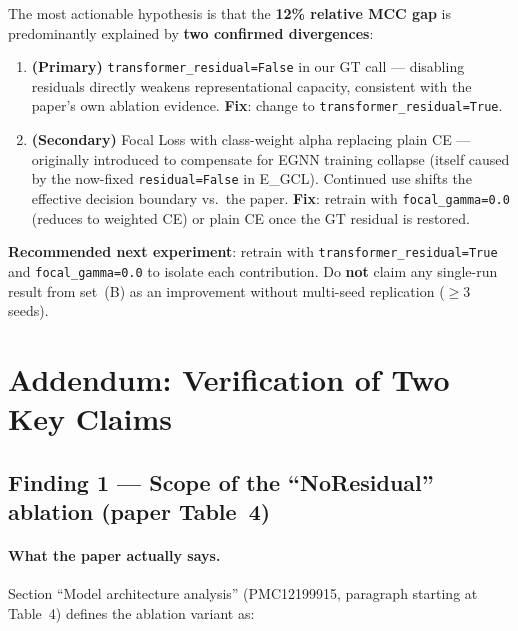 \documentclass[10pt, a4paper]{article}
\newcommand{\code}[1]{\texttt{\small #1}}
\begin{document}
\begin{tcolorbox}[colback=lightbg, colframe=primaryblue,
    title=\textbf{Root Cause Hypothesis and Recommended Action}]
The most actionable hypothesis is that the \textbf{12\% relative MCC gap} is
predominantly explained by \textbf{two confirmed divergences}:

\begin{enumerate}[leftmargin=1.5em, itemsep=2pt]
    \item \textbf{(Primary)} \code{transformer\_residual=False} in our GT call ---
    disabling residuals directly weakens representational capacity, consistent with
    the paper's own ablation evidence. \textbf{Fix}: change to \code{transformer\_residual=True}.

    \item \textbf{(Secondary)} Focal Loss with class-weight alpha replacing plain CE ---
    originally introduced to compensate for EGNN training collapse (itself caused by
    the now-fixed \code{residual=False} in E\_GCL).
    Continued use shifts the effective decision boundary vs.\ the paper.
    \textbf{Fix}: retrain with \code{focal\_gamma=0.0} (reduces to weighted CE) or plain CE
    once the GT residual is restored.
\end{enumerate}

\textbf{Recommended next experiment}: retrain with \code{transformer\_residual=True}
and \code{focal\_gamma=0.0} to isolate each contribution.
Do \textbf{not} claim any single-run result from set~(B) as an improvement without
multi-seed replication ($\geq$3 seeds).
\end{tcolorbox}


\newpage

\section{Addendum: Verification of Two Key Claims}

\subsection{Finding 1 --- Scope of the ``NoResidual'' ablation (paper Table~4)}

\paragraph{What the paper actually says.}
Section ``Model architecture analysis'' (PMC12199915, paragraph starting at Table~4)
defines the ablation variant as:
\end{document}
